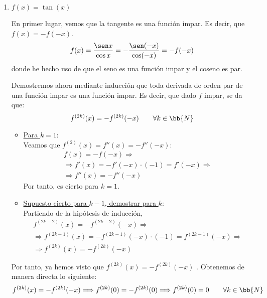 \begin{ejercicio}
\begin{enumerate}
        \item $f(x) = \tan(x)$

        En primer lugar, vemos que la tangente es una función impar. Es decir, que $f(x)=-f(-x)$.
        \begin{equation*}
            f(x) = \frac{\sen x}{\cos x} = -\frac{\sen(-x)}{\cos (-x)} = -f(-x)
        \end{equation*}
        donde he hecho uso de que el seno es una función impar y el coseno es par.
        
        Demostremos ahora mediante inducción que toda derivada de orden par de una función impar es una función impar. Es decir, que dado $f$ impar, se da que:
        \begin{equation*}
            f^{(2k)}(x) = - f^{(2k)}(-x) \qquad \forall k\in \bb{N}
        \end{equation*}
        \begin{itemize}
            \item \underline{Para $k=1$}:\\
            Veamos que $f^{(2)}(x)=f''(x) = -f''(-x)$:
            \begin{multline*}
                f(x) = -f(-x)
                \Longrightarrow \\ \Longrightarrow
                f'(x) = -f'(-x)\cdot (-1) = f'(-x)
                \Longrightarrow \\ \Longrightarrow
                f''(x) = -f''(-x)
            \end{multline*}
            Por tanto, es cierto para $k=1$.

            \item \underline{Supuesto cierto para $k-1$, demostrar para $k$}:\\
            Partiendo de la hipótesis de inducción,
            \begin{multline*}
                f^{(2k-2)}(x) = -f^{(2k-2)}(-x)
                \Longrightarrow \\ \Longrightarrow
                f^{(2k-1)}(x) = -f^{(2k-1)}(-x)\cdot (-1) = f^{(2k-1)}(-x)
                \Longrightarrow \\ \Longrightarrow
                f^{(2k)}(x) = -f^{(2k)}(-x)
            \end{multline*}
        \end{itemize}
        Por tanto, ya hemos visto que $f^{(2k)}(x) = - f^{(2k)}(-x)$ . Obtenemos de manera directa lo siguiente:
        \begin{equation*}
            f^{(2k)}(x) = - f^{(2k)}(-x) \Longrightarrow  f^{(2k)}(0) = - f^{(2k)}(0) \Longrightarrow f^{(2k)}(0) = 0 \qquad \forall k\in \bb{N}
        \end{equation*}


\end{enumerate}
\end{ejercicio}
